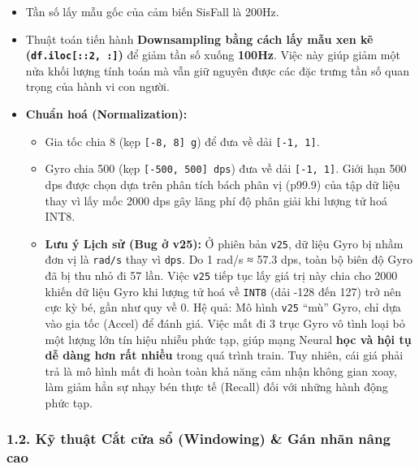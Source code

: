 \documentclass[12pt,a4paper]{article}
\providecommand{\tightlist}{\setlength{\itemsep}{0pt}\setlength{\parskip}{0pt}}
\begin{document}
\begin{itemize}
\tightlist
\item
  Tần số lấy mẫu gốc của cảm biến SisFall là 200Hz.
\item
  Thuật toán tiến hành \textbf{Downsampling bằng cách lấy mẫu xen kẽ
  (\texttt{df.iloc{[}::2,\ :{]}})} để giảm tần số xuống \textbf{100Hz}.
  Việc này giúp giảm một nửa khối lượng tính toán mà vẫn giữ nguyên được
  các đặc trưng tần số quan trọng của hành vi con người.
\item
  \textbf{Chuẩn hoá (Normalization):}

  \begin{itemize}
  \tightlist
  \item
    Gia tốc chia 8 (kẹp \texttt{{[}-8,\ 8{]}\ g}) để đưa về dải
    \texttt{{[}-1,\ 1{]}}.
  \item
    Gyro chia 500 (kẹp \texttt{{[}-500,\ 500{]}\ dps}) đưa về dải
    \texttt{{[}-1,\ 1{]}}. Giới hạn 500 dps được chọn dựa trên phân tích
    bách phân vị (p99.9) của tập dữ liệu thay vì lấy mốc 2000 dps gây
    lãng phí độ phân giải khi lượng tử hoá INT8.
  \item
    \textbf{Lưu ý Lịch sử (Bug ở v25):} Ở phiên bản \texttt{v25}, dữ
    liệu Gyro bị nhầm đơn vị là \texttt{rad/s} thay vì \texttt{dps}. Do
    1 rad/s ≈ 57.3 dps, toàn bộ biên độ Gyro đã bị thu nhỏ đi 57 lần.
    Việc \texttt{v25} tiếp tục lấy giá trị này chia cho 2000 khiến dữ
    liệu Gyro khi lượng tử hoá về \texttt{INT8} (dải -128 đến 127) trở
    nên cực kỳ bé, gần như quy về 0. Hệ quả: Mô hình \texttt{v25} ``mù''
    Gyro, chỉ dựa vào gia tốc (Accel) để đánh giá. Việc mất đi 3 trục
    Gyro vô tình loại bỏ một lượng lớn tín hiệu nhiễu phức tạp, giúp
    mạng Neural \textbf{học và hội tụ dễ dàng hơn rất nhiều} trong quá
    trình train. Tuy nhiên, cái giá phải trả là mô hình mất đi hoàn toàn
    khả năng cảm nhận không gian xoay, làm giảm hẳn sự nhạy bén thực tế
    (Recall) đối với những hành động phức tạp.
  \end{itemize}
\end{itemize}

\subsubsection{1.2. Kỹ thuật Cắt cửa sổ (Windowing) \& Gán nhãn nâng
cao}\label{kux1ef9-thuux1eadt-cux1eaft-cux1eeda-sux1ed5-windowing-guxe1n-nhuxe3n-nuxe2ng-cao}
\end{document}
